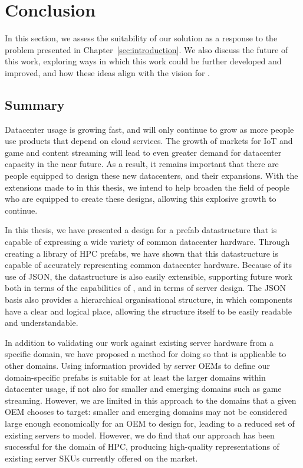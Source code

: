 \documentclass[11pt]{article}
\begin{document}
\newpage

\section{Conclusion} \label{sec:conclusion}
	In this section, we assess the suitability of our solution as a response to the problem presented in Chapter~\ref{sec:introduction}.
	We also discuss the future of this work, exploring ways in which this work could be further developed and improved, and how these ideas align with the vision for \opendc{} \cite{Iosup2017}.

	\subsection{Summary}
		Datacenter usage is growing fast, and will only continue to grow as more people use products that depend on cloud services.
		The growth of markets for IoT and game and content streaming will lead to even greater demand for datacenter capacity in the near future.
		As a result, it remains important that there are people equipped to design these new datacenters, and their expansions.
		With the extensions made to \opendc{} in this thesis, we intend to help broaden the field of people who are equipped to create these designs, allowing this explosive growth to continue.

		In this thesis, we have presented a design for a prefab datastructure that is capable of expressing a wide variety of common datacenter hardware.
		Through creating a library of HPC prefabs, we have shown that this datastructure is capable of accurately representing common datacenter hardware.
		Because of its use of JSON, the datastructure is also easily extensible, supporting future work both in terms of the capabilities of \opendc{}, and in terms of server design.
		The JSON basis also provides a hierarchical organisational structure, in which components have a clear and logical place, allowing the structure itself to be easily readable and understandable.
		
		In addition to validating our work against existing server hardware from a specific domain, we have proposed a method for doing so that is applicable to other domains.
		Using information provided by server OEMs to define our domain-specific prefabs is suitable for at least the larger domains within datacenter usage, if not also for smaller and emerging domains such as game streaming.
		However, we are limited in this approach to the domains that a given OEM chooses to target: smaller and emerging domains may not be considered large enough economically for an OEM to design for, leading to a reduced set of existing servers to model.
		However, we do find that our approach has been successful for the domain of HPC, producing high-quality representations of existing server SKUs currently offered on the market.
\end{document}
